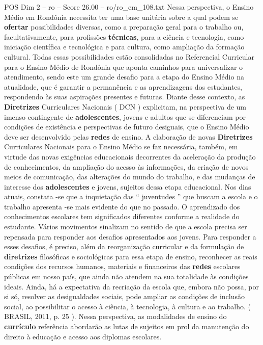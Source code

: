 \begin{textsample}{POS Dim 2 – ro – Score 26.00 – ro/ro\_em\_108.txt}
Nessa perspectiva, o Ensino Médio em Rondônia necessita ter uma base unitária sobre a qual podem se \textbf{ofertar} possibilidades diversas, como a preparação geral para o trabalho ou, facultativamente, para profissões \textbf{técnicas}, para a ciência e tecnologia, como iniciação científica e tecnológica e para cultura, como ampliação da formação cultural.
Todas essas possibilidades estão consolidadas no Referencial Curricular para o Ensino Médio de Rondônia que aponta caminhos para universalizar o atendimento, sendo este um grande desafio para a etapa do Ensino Médio na atualidade, que é garantir a permanência e as aprendizagens dos estudantes, respondendo às suas aspirações presentes e futuras.
Diante desse contexto, as \textbf{Diretrizes} Curriculares Nacionais ( DCN ) explicitam, na perspectiva de um imenso contingente de \textbf{adolescentes}, jovens e adultos que se diferenciam por condições de existência e perspectivas de futuro desiguais, que o Ensino Médio deve ser desenvolvido pelas \textbf{redes} de ensino.
A elaboração de novas \textbf{Diretrizes} Curriculares Nacionais para o Ensino Médio se faz necessária, também, em virtude das novas exigências educacionais decorrentes da aceleração da produção de conhecimentos, da ampliação do acesso às informações, da criação de novos meios de comunicação, das alterações do mundo do trabalho, e das mudanças de interesse dos \textbf{adolescentes} e jovens, sujeitos dessa etapa educacional.
Nos dias atuais, constata -se que a inquietação das “ juventudes ” que buscam a escola e o trabalho apresenta -se mais evidente do que no passado.
O aprendizado dos conhecimentos escolares tem significados diferentes conforme a realidade do estudante.
Vários movimentos sinalizam no sentido de que a escola precisa ser repensada para responder aos desafios apresentados aos jovens.
Para responder a esses desafios, é preciso, além da reorganização curricular e da formulação de \textbf{diretrizes} filosóficas e sociológicas para essa etapa de ensino, reconhecer as reais condições dos recursos humanos, materiais e financeiros das \textbf{redes} escolares públicas em nosso país, que ainda não atendem na sua totalidade às condições ideais.
Ainda, há a expectativa da recriação da escola que, embora não possa, por si só, resolver as desigualdades sociais, pode ampliar as condições de inclusão social, ao possibilitar o acesso à ciência, à tecnologia, à cultura e ao trabalho. ( BRASIL, 2011, p. 25 ).
Nessa perspectiva, as modalidades de ensino do \textbf{currículo} referência abordarão as lutas de sujeitos em prol da manutenção do direito à educação e acesso aos diplomas escolares.

\end{textsample}
